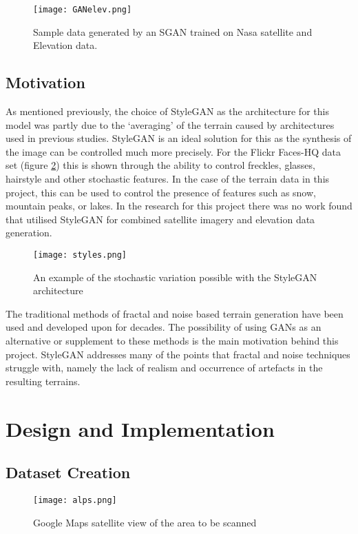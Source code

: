 \documentclass[a4paper]{report}
\begin{document}
\begin{figure}[H]
    \centering
        \texttt{[image: GANelev.png]}
        \caption{Sample data generated by an SGAN trained on Nasa satellite and Elevation data. \cite{sgan}}
        \label{fig:elevGAN}
\end{figure}

\subsection{Motivation}
As mentioned previously, the choice of StyleGAN as the architecture for this model was partly due to the `averaging' of the terrain caused by architectures used in previous studies. StyleGAN is an ideal solution for this as the synthesis of the image can be controlled much more precisely. For the Flickr Faces-HQ data set (figure \ref{fig:styles}) this is shown through the ability to control freckles, glasses, hairstyle and other stochastic features. In the case of the terrain data in this project, this can be used to control the presence of features such as snow, mountain peaks, or lakes. In the research for this project there was no work found that utilised StyleGAN for combined satellite imagery and elevation data generation.

\begin{figure}[H]
    \centering
        \texttt{[image: styles.png]}
        \caption{An example of the stochastic variation possible with the StyleGAN architecture \cite{stylegan}}
        \label{fig:styles}
\end{figure}

The traditional methods of fractal and noise based terrain generation have been used and developed upon for decades. The possibility of using GANs as an alternative or supplement to these methods is the main motivation behind this project. StyleGAN addresses many of the points that fractal and noise techniques struggle with, namely the lack of realism and occurrence of artefacts in the resulting terrains.
\section{Design and Implementation}
\subsection{Dataset Creation}

\begin{figure}[H]
    \centering
        \texttt{[image: alps.png]}
        \caption{Google Maps satellite view of the area to be scanned}
        \label{fig:alps}
\end{figure}
\end{document}
